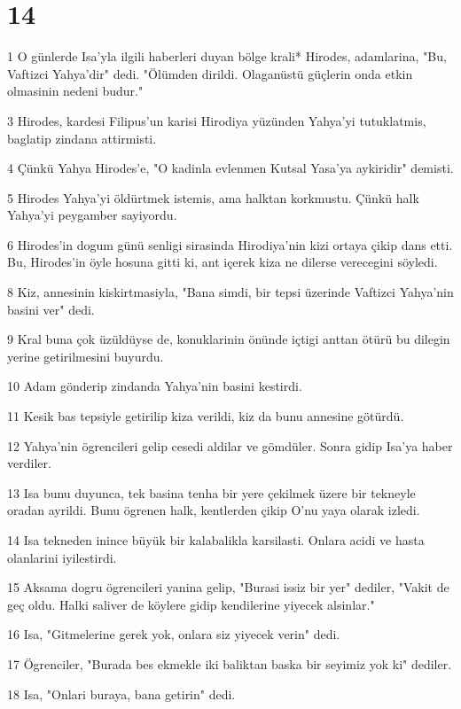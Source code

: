 \chapter{14}

\par 1 O günlerde Isa'yla ilgili haberleri duyan bölge krali* Hirodes, adamlarina, "Bu, Vaftizci Yahya'dir" dedi. "Ölümden dirildi. Olaganüstü güçlerin onda etkin olmasinin nedeni budur."
\par 3 Hirodes, kardesi Filipus'un karisi Hirodiya yüzünden Yahya'yi tutuklatmis, baglatip zindana attirmisti.
\par 4 Çünkü Yahya Hirodes'e, "O kadinla evlenmen Kutsal Yasa'ya aykiridir" demisti.
\par 5 Hirodes Yahya'yi öldürtmek istemis, ama halktan korkmustu. Çünkü halk Yahya'yi peygamber sayiyordu.
\par 6 Hirodes'in dogum günü senligi sirasinda Hirodiya'nin kizi ortaya çikip dans etti. Bu, Hirodes'in öyle hosuna gitti ki, ant içerek kiza ne dilerse verecegini söyledi.
\par 8 Kiz, annesinin kiskirtmasiyla, "Bana simdi, bir tepsi üzerinde Vaftizci Yahya'nin basini ver" dedi.
\par 9 Kral buna çok üzüldüyse de, konuklarinin önünde içtigi anttan ötürü bu dilegin yerine getirilmesini buyurdu.
\par 10 Adam gönderip zindanda Yahya'nin basini kestirdi.
\par 11 Kesik bas tepsiyle getirilip kiza verildi, kiz da bunu annesine götürdü.
\par 12 Yahya'nin ögrencileri gelip cesedi aldilar ve gömdüler. Sonra gidip Isa'ya haber verdiler.
\par 13 Isa bunu duyunca, tek basina tenha bir yere çekilmek üzere bir tekneyle oradan ayrildi. Bunu ögrenen halk, kentlerden çikip O'nu yaya olarak izledi.
\par 14 Isa tekneden inince büyük bir kalabalikla karsilasti. Onlara acidi ve hasta olanlarini iyilestirdi.
\par 15 Aksama dogru ögrencileri yanina gelip, "Burasi issiz bir yer" dediler, "Vakit de geç oldu. Halki saliver de köylere gidip kendilerine yiyecek alsinlar."
\par 16 Isa, "Gitmelerine gerek yok, onlara siz yiyecek verin" dedi.
\par 17 Ögrenciler, "Burada bes ekmekle iki baliktan baska bir seyimiz yok ki" dediler.
\par 18 Isa, "Onlari buraya, bana getirin" dedi.
